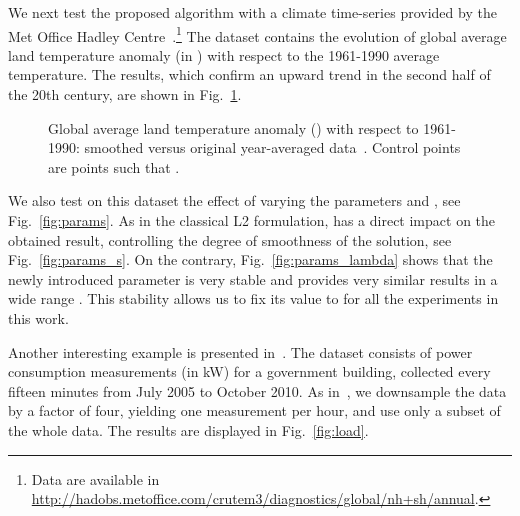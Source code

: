 \documentclass[preprint]{imsart}
\begin{document}
We next test the proposed algorithm with a climate time-series provided by the Met Office Hadley Centre~\cite{brohan06}.\footnote{Data are available in \url{http://hadobs.metoffice.com/crutem3/diagnostics/global/nh+sh/annual}.} The dataset contains the evolution of global average land temperature anomaly (in \textcelsius) with respect to the 1961-1990 average temperature. The results, which confirm an upward trend in the second half of the 20th century, are shown in Fig.~\ref{fig:temp}.

\begin{figure}
    
    \caption{Global average land temperature anomaly (\textcelsius) with respect to 1961-1990: smoothed versus original year-averaged data~\cite{brohan06}. Control points are points such that .}
    \label{fig:temp}
\end{figure}

We also test on this dataset the effect of varying the parameters  and , see Fig.~\ref{fig:params}. As in the classical L2 formulation,  has a direct impact on the obtained result, controlling the degree of smoothness of the solution, see Fig.~\ref{fig:params_s}. On the contrary, Fig.~\ref{fig:params_lambda} shows that the newly introduced parameter  is very stable and provides very similar results in a wide range . This stability allows us to fix its value to  for all the experiments in this work.

\begin{figure*}
    \centering
{}




    \caption{Changing the value of  in L1 splines controls the trade-off between fitting and smoothing. L1 splines are quite insensitive to the value of , making it easy to tune.}
    \label{fig:params}
\end{figure*}

Another interesting example is presented in~\cite{mateos12}. The dataset consists of power consumption measurements (in kW) for a government building, collected every fifteen minutes from July 2005 to October 2010. As in~\cite{mateos12}, we downsample the data by a factor of four, yielding one measurement per hour, and use only a subset of the whole data. The results are displayed in Fig.~\ref{fig:load}.
\end{document}
